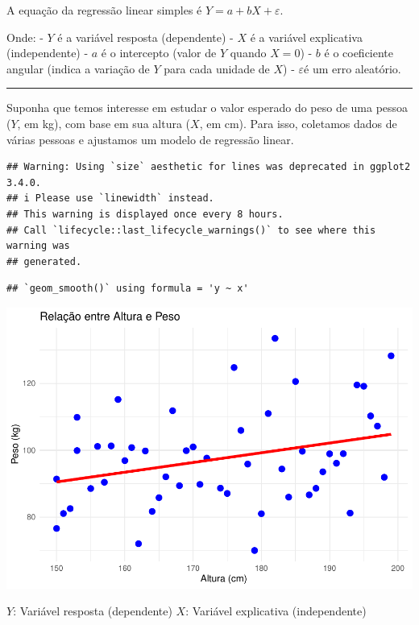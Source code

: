 \documentclass[
]{book}
\begin{document}
A equação da regressão linear simples é \(Y = a + b X + \varepsilon\).

Onde:
- \(Y\) é a variável resposta (dependente)
- \(X\) é a variável explicativa (independente)
- \(a\) é o intercepto (valor de \(Y\) quando \(X = 0\))
- \(b\) é o coeficiente angular (indica a variação de \(Y\) para cada unidade de \(X\))
- \(\varepsilon\)é um erro aleatório.

\begin{center}\rule{0.5\linewidth}{0.5pt}\end{center}

Suponha que temos interesse em estudar o valor esperado do peso de uma pessoa (\(Y\), em kg), com base em sua altura (\(X\), em cm). Para isso, coletamos dados de várias pessoas e ajustamos um modelo de regressão linear.

\begin{verbatim}
## Warning: Using `size` aesthetic for lines was deprecated in ggplot2 3.4.0.
## i Please use `linewidth` instead.
## This warning is displayed once every 8 hours.
## Call `lifecycle::last_lifecycle_warnings()` to see where this warning was
## generated.
\end{verbatim}

\begin{verbatim}
## `geom_smooth()` using formula = 'y ~ x'
\end{verbatim}

\begin{center}\includegraphics{AED_files/figure-latex/graf_regrecao-1} \end{center}

\(Y\): Variável resposta (dependente)
\(X\): Variável explicativa (independente)
\end{document}

